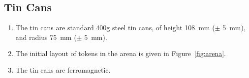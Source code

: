 \subsection{Tin Cans}
\label{spec:cans}

\begin{enumerate}
  \item The tin cans are standard 400g steel tin cans, of height \SI{108}{mm}
        ($\pm$ \SI{5}{mm}), and radius \SI{75}{mm} ($\pm$ \SI{5}{mm}).
  \item The initial layout of tokens in the arena is given in
        Figure~\ref{fig:arena}.
  \item The tin cans are ferromagnetic.
\end{enumerate}

